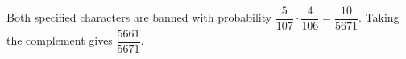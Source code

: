Both specified characters are banned with probability $\dfrac{5}{107}\cdot\dfrac{4}{106}=\dfrac{10}{5671}$. Taking the complement gives $\boxed{\dfrac{5661}{5671}}$.
